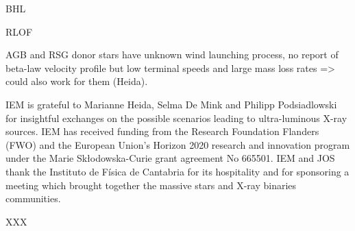 \documentclass[letter]{aa}
\begin{document}
BHL

RLOF

AGB and RSG donor stars have unknown wind launching process, no report of beta-law velocity profile but low terminal speeds and large mass loss rates => could also work for them (Heida).

\begin{acknowledgements}
IEM is grateful to Marianne Heida, Selma De Mink and Philipp Podsiadlowski for insightful exchanges on the possible scenarios leading to ultra-luminous X-ray sources. IEM has received funding from the Research Foundation Flanders (FWO) and the European Union's Horizon 2020 research and innovation program under the Marie Sk\l odowska-Curie grant agreement No 665501. IEM and JOS thank the Instituto de F\'{i}sica de Cantabria for its hospitality and for sponsoring a meeting which brought together the massive stars and X-ray binaries communities.
\end{acknowledgements}

XXX

\begin{tiny}

\end{tiny}
\end{document}
